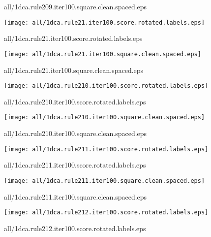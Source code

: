 \documentclass{article}
\begin{document}
{\footnotesize all/1dca.rule209.iter100.square.clean.spaced.eps}
\begin{center}
\begin{minipage}{\textwidth}
\texttt{[image: all/1dca.rule21.iter100.score.rotated.labels.eps]}
\end{minipage}
\end{center}
{\footnotesize all/1dca.rule21.iter100.score.rotated.labels.eps}
\begin{center}
\begin{minipage}{\textwidth}
\texttt{[image: all/1dca.rule21.iter100.square.clean.spaced.eps]}
\end{minipage}
\end{center}
{\footnotesize all/1dca.rule21.iter100.square.clean.spaced.eps}
\begin{center}
\begin{minipage}{\textwidth}
\texttt{[image: all/1dca.rule210.iter100.score.rotated.labels.eps]}
\end{minipage}
\end{center}
{\footnotesize all/1dca.rule210.iter100.score.rotated.labels.eps}
\begin{center}
\begin{minipage}{\textwidth}
\texttt{[image: all/1dca.rule210.iter100.square.clean.spaced.eps]}
\end{minipage}
\end{center}
{\footnotesize all/1dca.rule210.iter100.square.clean.spaced.eps}
\begin{center}
\begin{minipage}{\textwidth}
\texttt{[image: all/1dca.rule211.iter100.score.rotated.labels.eps]}
\end{minipage}
\end{center}
{\footnotesize all/1dca.rule211.iter100.score.rotated.labels.eps}
\begin{center}
\begin{minipage}{\textwidth}
\texttt{[image: all/1dca.rule211.iter100.square.clean.spaced.eps]}
\end{minipage}
\end{center}
{\footnotesize all/1dca.rule211.iter100.square.clean.spaced.eps}
\begin{center}
\begin{minipage}{\textwidth}
\texttt{[image: all/1dca.rule212.iter100.score.rotated.labels.eps]}
\end{minipage}
\end{center}
{\footnotesize all/1dca.rule212.iter100.score.rotated.labels.eps}
\end{document}
